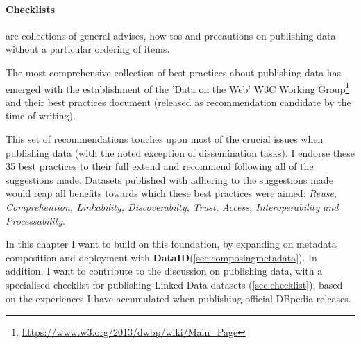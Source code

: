 \documentclass[a4paper,english,twoside,BCOR1.5cm,headsepline,DIV12,appendixprefix,final,12pt]{scrbook}
\newcommand{\dataid}{{\ttfamily\bfseries DataID}\xspace}
\newcommand\footnoteurl[1]{\footnote{\scriptsize\url{#1}}}
\begin{document}
\paragraph{Checklists} are collections of general advises, how-tos and precautions on publishing data without a particular ordering of items. 

The most comprehensive collection of best practices about publishing data has emerged with the establishment  
of the 'Data on the Web' W3C Working Group\footnoteurl{https://www.w3.org/2013/dwbp/wiki/Main_Page} and their best practices document \cite{dwbpW3C2016} (released as recommendation candidate by the time of writing). 


This set of recommendations touches upon most of the crucial issues when publishing data (with the noted exception of dissemination tasks). I endorse these 35 best practices to their full extend and recommend following all of the suggestions made. Datasets published with adhering to the suggestions made would reap all benefits towards which these best practices were aimed: \textit{Reuse, Comprehention, Linkability, Discoverabilty, Trust, Access, Interoperability and Processability}.

In this chapter I want to build on this foundation, by expanding on metadata composition and deployment with \dataid (\cref{sec:composingmetadata}). In addition, I want to contribute to the discussion on publishing data, with a specialised checklist  for publishing Linked Data datasets (\cref{sec:checklist}), based on the experiences I have accumulated when publishing official DBpedia releases.
\end{document}
